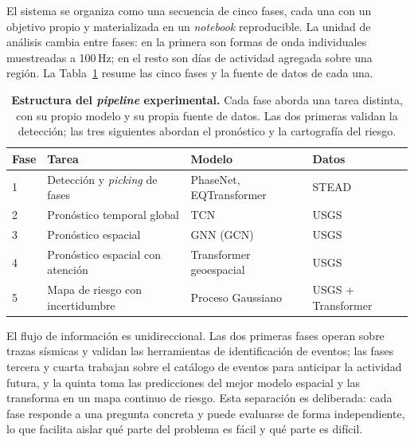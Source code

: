 El sistema se organiza como una secuencia de cinco fases, cada una con un objetivo propio y
materializada en un \textit{notebook} reproducible. La unidad de análisis cambia entre
fases: en la primera son formas de onda individuales muestreadas a 100\,Hz; en el resto
son días de actividad agregada sobre una región. La Tabla~\ref{tab:pipeline} resume las
cinco fases y la fuente de datos de cada una.

\begin{table}[ht!]
  \centering
  \small
  \begin{tabular}{@{}llll@{}}
    \toprule
    \textbf{Fase} & \textbf{Tarea}                        & \textbf{Modelo}         & \textbf{Datos}     \\
    \midrule
    1             & Detección y \textit{picking} de fases & PhaseNet, EQTransformer & STEAD              \\
    2             & Pronóstico temporal global            & TCN                     & USGS               \\
    3             & Pronóstico espacial                   & GNN (GCN)               & USGS               \\
    4             & Pronóstico espacial con atención      & Transformer geoespacial & USGS               \\
    5             & Mapa de riesgo con incertidumbre      & Proceso Gaussiano       & USGS + Transformer \\
    \bottomrule
  \end{tabular}
  \caption[Estructura del \textit{pipeline} experimental en cinco fases]{\textbf{Estructura del \textit{pipeline} experimental.} Cada fase aborda una tarea distinta, con su propio modelo y su propia fuente de datos. Las dos primeras validan la detección; las tres siguientes abordan el pronóstico y la cartografía del riesgo.}
  \label{tab:pipeline}
\end{table}

El flujo de información es unidireccional. Las dos primeras fases operan sobre trazas sísmicas y validan las herramientas de identificación de eventos; las fases tercera y cuarta
trabajan sobre el catálogo de eventos para anticipar la actividad futura, y la quinta toma
las predicciones del mejor modelo espacial y las transforma en un mapa continuo de riesgo.
Esta separación es deliberada: cada fase responde a una pregunta concreta y puede evaluarse
de forma independiente, lo que facilita aislar qué parte del problema es fácil y qué parte
es difícil.

